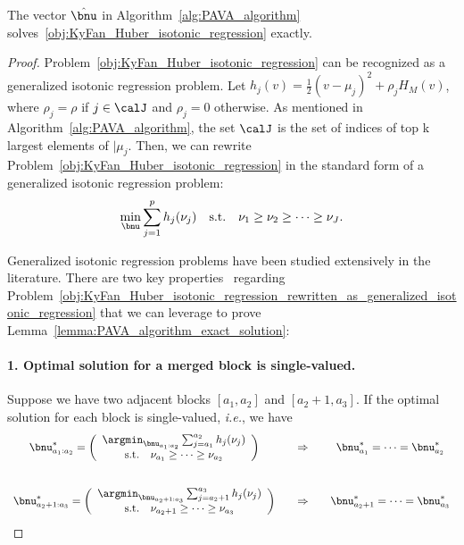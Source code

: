\begin{namedlemma}
    [~\ref{lemma:PAVA_algorithm_exact_solution}]
    The vector $\hat \bnu$ in Algorithm~\ref{alg:PAVA_algorithm} solves~\eqref{obj:KyFan_Huber_isotonic_regression} exactly.
\end{namedlemma}

\begin{proof}
    Problem~\eqref{obj:KyFan_Huber_isotonic_regression} can be recognized as a generalized isotonic regression problem.
    Let $h_j(v) = \frac{1}{2} (v - \mu_j)^2 + \rho_j H_M(v)$, where $\rho_j = \rho$ if $j \in \calJ$ and $\rho_j = 0$ otherwise.
    As mentioned in Algorithm~\ref{alg:PAVA_algorithm}, the set $\calJ$ is the set of indices of top k largest elements of $\vert{\mu_j}$.
    Then, we can rewrite Problem~\eqref{obj:KyFan_Huber_isotonic_regression} in the standard form of a generalized isotonic regression problem:
    \begin{align}
        \label{obj:KyFan_Huber_isotonic_regression_rewritten_as_generalized_isotonic_regression}
        \min_{\bnu} \sum_{j=1}^{p} h_j(\nu_j) \quad \text{s.t.} \quad \nu_1 \geq \nu_2 \geq \cdots \geq \nu_J.
    \end{align}
    
    Generalized isotonic regression problems have been studied extensively in the literature.
    There are two key properties~\cite{best2000minimizing,ahuja2001fast} regarding Problem~\eqref{obj:KyFan_Huber_isotonic_regression_rewritten_as_generalized_isotonic_regression} that we can leverage to prove Lemma~\ref{lemma:PAVA_algorithm_exact_solution}:
    
    \paragraph{1. Optimal solution for a merged block is single-valued.}
    Suppose we have two adjacent blocks $[a_1, a_2]$ and $[a_2+1, a_3]$.
    If the optimal solution for each block is single-valued, \textit{i.e.}, we have
    \begin{equation}
    \begin{array}{c@{\hspace{2em}}c@{\hspace{2em}}c}
    \bnu_{a_1:a_2}^* =  
    \left(\begin{array}{c}
    \argmin_{\bnu_{a_1:a_2}} \sum_{j=a_1}^{a_2} h_j(\nu_j) \\
    \text{s.t.} \quad \nu_{a_1} \geq \cdots \geq \nu_{a_2}
    \end{array}\right) & 
    \Rightarrow & \bnu_{a_1}^* = \cdots = \bnu_{a_2}^* \\[3em]
    \bnu_{a_2+1:a_3}^* =  
    \left(\begin{array}{c}
    \argmin_{\bnu_{a_2+1:a_3}} \sum_{j=a_2+1}^{a_3} h_j(\nu_j) \\
    \text{s.t.} \quad \nu_{a_2+1} \geq \cdots \geq \nu_{a_3}
    \end{array}\right) & 
    \Rightarrow & \bnu_{a_2+1}^* = \cdots = \bnu_{a_3}^*
    \end{array}
    \end{equation}
    

\end{proof}
